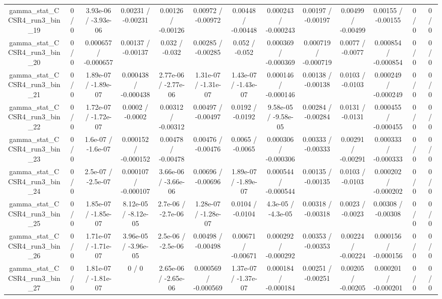 \documentclass[10pt]{article}
\begin{document}
\begin{table}[htbp]
\begin{center}
\begin{tabular}{|c|c|c|c|c|c|c|c|c|c|c|c|c|}
  gamma_stat_CCSR4_run3_bin_19 & 0 / 0 & 3.93e-06 / -3.93e-06 & 0.00231 / -0.00231 & 0.00126 / -0.00126 & 0.00972 / -0.00972 & 0.00448 / -0.00448 & 0.000243 / -0.000243 & 0.00197 / -0.00197 & 0.00499 / -0.00499 & 0.00155 / -0.00155 & 0 / 0 & 0 / 0 \\ 
  gamma_stat_CCSR4_run3_bin_20 & 0 / 0 & 0.000657 / -0.000657 & 0.00137 / -0.00137 & 0.032 / -0.032 & 0.00285 / -0.00285 & 0.052 / -0.052 & 0.000369 / -0.000369 & 0.000719 / -0.000719 & 0.0077 / -0.0077 & 0.000854 / -0.000854 & 0 / 0 & 0 / 0 \\ 
  gamma_stat_CCSR4_run3_bin_21 & 0 / 0 & 1.89e-07 / -1.89e-07 & 0.000438 / -0.000438 & 2.77e-06 / -2.77e-06 & 1.31e-07 / -1.31e-07 & 1.43e-07 / -1.43e-07 & 0.000146 / -0.000146 & 0.00138 / -0.00138 & 0.0103 / -0.0103 & 0.000249 / -0.000249 & 0 / 0 & 0 / 0 \\ 
  gamma_stat_CCSR4_run3_bin_22 & 0 / 0 & 1.72e-07 / -1.72e-07 & 0.0002 / -0.0002 & 0.00312 / -0.00312 & 0.00497 / -0.00497 & 0.0192 / -0.0192 & 9.58e-05 / -9.58e-05 & 0.00284 / -0.00284 & 0.0131 / -0.0131 & 0.000455 / -0.000455 & 0 / 0 & 0 / 0 \\ 
  gamma_stat_CCSR4_run3_bin_23 & 0 / 0 & 1.6e-07 / -1.6e-07 & 0.000152 / -0.000152 & 0.00478 / -0.00478 & 0.00476 / -0.00476 & 0.0065 / -0.0065 & 0.000306 / -0.000306 & 0.00333 / -0.00333 & 0.00291 / -0.00291 & 0.000333 / -0.000333 & 0 / 0 & 0 / 0 \\ 
  gamma_stat_CCSR4_run3_bin_24 & 0 / 0 & 2.5e-07 / -2.5e-07 & 0.000107 / -0.000107 & 3.66e-06 / -3.66e-06 & 0.00696 / -0.00696 & 1.89e-07 / -1.89e-07 & 0.000544 / -0.000544 & 0.00135 / -0.00135 & 0.0103 / -0.0103 & 0.000202 / -0.000202 & 0 / 0 & 0 / 0 \\ 
  gamma_stat_CCSR4_run3_bin_25 & 0 / 0 & 1.85e-07 / -1.85e-07 & 8.12e-05 / -8.12e-05 & 2.7e-06 / -2.7e-06 & 1.28e-07 / -1.28e-07 & 0.0104 / -0.0104 & 4.3e-05 / -4.3e-05 & 0.00318 / -0.00318 & 0.0023 / -0.0023 & 0.00308 / -0.00308 & 0 / 0 & 0 / 0 \\ 
  gamma_stat_CCSR4_run3_bin_26 & 0 / 0 & 1.71e-07 / -1.71e-07 & 3.96e-05 / -3.96e-05 & 2.5e-06 / -2.5e-06 & 0.00498 / -0.00498 & 0.00671 / -0.00671 & 0.000292 / -0.000292 & 0.00353 / -0.00353 & 0.00224 / -0.00224 & 0.000156 / -0.000156 & 0 / 0 & 0 / 0 \\ 
  gamma_stat_CCSR4_run3_bin_27 & 0 / 0 & 1.81e-07 / -1.81e-07 & 0 / 0 & 2.65e-06 / -2.65e-06 & 0.000569 / -0.000569 & 1.37e-07 / -1.37e-07 & 0.000184 / -0.000184 & 0.00251 / -0.00251 & 0.00205 / -0.00205 & 0.000201 / -0.000201 & 0 / 0 & 0 / 0 \\ 

\end{tabular}
\end{center}
\end{table}
\end{document}
